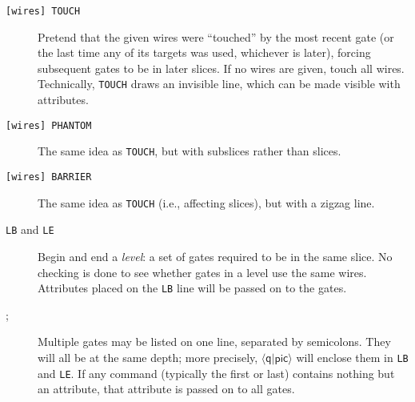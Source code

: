 \documentclass[twoside,12pt]{article}
\newcommand{\qpic}{$\langle\mathsf{q}|\mathsf{pic}\rangle$\xspace}
\begin{document}
\begin{description}
\item[{\tt [wires] TOUCH}] Pretend that the given wires were ``touched'' by the most recent gate (or the last time any of its targets was used, whichever is later), forcing subsequent gates
  to be in later slices.  If no wires are given, touch all wires.  Technically,
  {\tt TOUCH} draws an invisible line, which can be made visible with attributes.

\begin{minipage}[b]{2in}

\end{minipage} \hfill 

\item[{\tt [wires] PHANTOM}] The same idea as {\tt TOUCH}, but with subslices rather than slices.

\begin{minipage}[b]{2in}

\end{minipage} \hfill 

\item[{\tt [wires] BARRIER}] The same idea as {\tt TOUCH} (i.e., affecting slices),
  but with a zigzag line.

\begin{minipage}[b]{2in}

\end{minipage} \hfill 

\item[{\tt LB} and {\tt LE}] Begin and end a \emph{level}: a set of gates required to be in the
same slice.  No checking is done to see whether gates in a level use the
same wires.  Attributes placed on the {\tt LB} line will be passed on to the gates.

\begin{minipage}[b]{2in}

\end{minipage} \hfill 

\item[{;}] Multiple gates may be listed on one line, separated by semicolons.
  They will all be at the same depth; more precisely, \qpic will
  enclose them in {\tt LB} and {\tt LE}.
  If any command (typically the first or last) contains nothing but an
  attribute, that attribute is passed on to all gates.

\begin{minipage}[b]{2in}

\end{minipage} \hfill 


\end{description}
\end{document}
